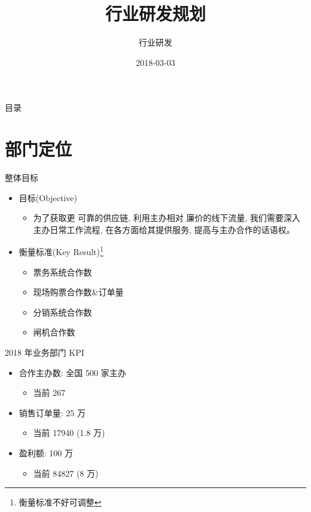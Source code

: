 \documentclass[presentation, bigger]{beamer}
\author{行业研发}
\date{2018-03-03}
\title{行业研发规划}
\begin{document}
\maketitle
\begin{frame}{目录}
\tableofcontents
\end{frame}


\section{部门定位}
\label{sec:org051f320}
\begin{frame}[label={sec:org5362c56}]{整体目标}
\begin{itemize}
\item 目标(Objective)
\begin{itemize}
\item 为了获取更 \alert{可靠的供应链}, 利用主办相对 \alert{廉价的线下流量}, 我们需要深入主办日常工作流程, 在各方面给其提供服务, 提高与主办合作的话语权。
\end{itemize}

\item 衡量标准(Key Result)\footnote{衡量标准不好可调整}
\begin{itemize}
\item 票务系统合作数
\item 现场购票合作数\&订单量
\item 分销系统合作数
\item 闸机合作数
\end{itemize}
\end{itemize}
\end{frame}

\begin{frame}[label={sec:org4dc5d16}]{2018 年业务部门 KPI}
\begin{itemize}
\item 合作主办数: \alert{全国 500 家主办}
\begin{itemize}
\item 当前 267
\end{itemize}
\item 销售订单量: \alert{25 万}
\begin{itemize}
\item 当前 17940 (1.8 万)
\end{itemize}
\item 盈利额:  \alert{100 万}
\begin{itemize}
\item 当前 84827 (8 万)
\end{itemize}
\end{itemize}
\end{frame}
\end{document}
